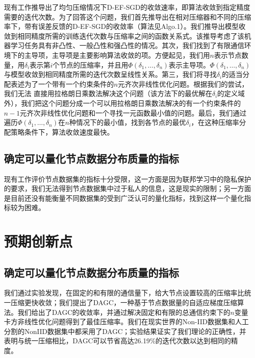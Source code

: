 现有工作推导出了均匀压缩情况下D-EF-SGD的收敛速率，即算法收敛到指定精度需要的迭代次数。为了回答这个问题，我们首先推导出在相对压缩器和不同的压缩率下，带有误差反馈的D-EF-SGD的收敛率（算法见Algo.1）。我们推导出模型收敛到相同精度所需的训练迭代次数与压缩率之间的函数关系式。该推导考虑了该机器学习任务具有非凸性、一般凸性和强凸性的情况。其次，我们找到了有限通信环境下的主导项，主导项是主要影响算法收敛的项。方便起见，我们用$n$表示节点数量，用$\delta_i$表示第$i$个节点的压缩率，并且用$\Phi(\delta_1,\ldots,\delta_n)$表示主导项。$\Phi(\delta_1,\ldots,\delta_n)$与模型收敛到相同精度所需的迭代次数呈线性关系。第三，我们将寻找$\delta_i$的适当分配表述为了一个带有一个约束条件的$n$元齐次非线性优化问题。根据我们的尝试，我们无法
直接用拉格朗日乘数法解决这个问题（该方法下的最优解在$\delta_i$的定义域外），我们把这个问题分成一个可以用拉格朗日乘数法解决的有一个约束条件的$n-1$元齐次非线性优化问题和一个寻找一元函数最小值的问题。最后，我们通过遍历$\Phi(\delta_1,\ldots,\delta_n)$在$n$种情况下的最小值，找到各节点的最优$\delta_i$，在这种压缩率分配策略条件下，算法收敛速度最快。



\subsection{确定可以量化节点数据分布质量的指标}

现有工作评价节点数据集的指标十分受限，这一方面是因为联邦学习中的隐私保护的要求，我们无法得到节点数据集中过于私人的信息，这是现实的限制；另一方面是目前还没有能衡量不同数据集的受到广泛认可的量化指标，找到这样一个量化指标较为困难。 

\section{预期创新点}

\subsection{确定可以量化节点数据分布质量的指标}

我们通过实验发现，在固定的和有限的通信量下，给大节点设置较高的压缩率比统一压缩更快收敛；我们提出了DAGC，一种基于节点数据量的自适应梯度压缩算法。我们给出了DAGC的收敛率，并通过解决固定和有限的总通信约束下的$n$变量卡方非线性优化问题得到了最佳压缩率。我们在现实世界的Non-IID数据集和人工分割的NonIID数据集中都采用了DAGC；实验结果证实了我们理论的正确性，并表明与统一压缩相比，DAGC可以节省高达26.19$\%$的迭代次数以达到相同的精度。

